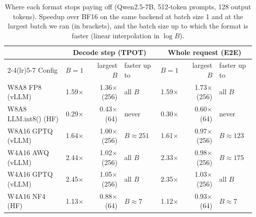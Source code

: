 \begin{table}[htbp]
\centering
\footnotesize
\caption{Where each format stops paying off (Qwen2.5-7B, 512-token prompts, 128 output tokens). Speedup over BF16 on the same backend at batch size 1 and at the largest batch we ran (in brackets), and the batch size up to which the format is faster (linear interpolation in $\log B$).}
\label{tab:crossover}
\setlength{\tabcolsep}{3.5pt}
\begin{tabular}{lrrlrrl}
\toprule
 & \multicolumn{3}{c}{Decode step (TPOT)} & \multicolumn{3}{c}{Whole request (E2E)} \\
\cmidrule(lr){2-4}\cmidrule(lr){5-7}
Config & $B{=}1$ & largest $B$ & faster up to & $B{=}1$ & largest $B$ & faster up to \\
\midrule
W8A8 FP8 (vLLM) & 1.59$\times$ & 1.36$\times$ (256) & all $B$ & 1.59$\times$ & 1.73$\times$ (256) & all $B$ \\
W8A8 LLM.int8() (HF) & 0.29$\times$ & 0.43$\times$ (64) & never & 0.30$\times$ & 0.60$\times$ (64) & never \\
W8A16 GPTQ (vLLM) & 1.64$\times$ & 1.00$\times$ (256) & $B\approx251$ & 1.61$\times$ & 0.97$\times$ (256) & $B\approx123$ \\
W4A16 AWQ (vLLM) & 2.44$\times$ & 1.02$\times$ (256) & all $B$ & 2.33$\times$ & 0.98$\times$ (256) & $B\approx175$ \\
W4A16 GPTQ (vLLM) & 2.45$\times$ & 1.05$\times$ (256) & all $B$ & 2.35$\times$ & 1.03$\times$ (256) & all $B$ \\
W4A16 NF4 (HF) & 1.13$\times$ & 0.88$\times$ (64) & $B\approx7$ & 1.12$\times$ & 0.93$\times$ (64) & $B\approx7$ \\
\bottomrule
\end{tabular}
\end{table}
